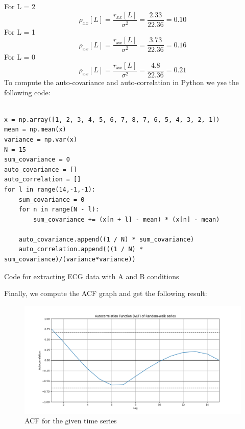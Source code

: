 \documentclass{article}
\begin{document}
   For L = 2
  \begin{equation}
       \rho_{xx}[L] = \frac{r_{xx}[L]}{\sigma ^2} = \frac{2.33}{22.36} = 0.10
 \end{equation}
   For L = 1
  \begin{equation}
       \rho_{xx}[L] = \frac{r_{xx}[L]}{\sigma ^2} = \frac{3.73}{22.36} = 0.16
 \end{equation}
   For L = 0
  \begin{equation}
      \rho_{xx}[L] = \frac{r_{xx}[L]}{\sigma ^2} = \frac{4.8}{22.36} = 0.21
 \end{equation}
To compute the auto-covariance and auto-correlation in Python we yse the following code:

\begin{listing}[H]
\begin{verbatim}

x = np.array([1, 2, 3, 4, 5, 6, 7, 8, 7, 6, 5, 4, 3, 2, 1])
mean = np.mean(x)
variance = np.var(x)
N = 15
sum_covariance = 0
auto_covariance = []
auto_correlation = []
for l in range(14,-1,-1):
    sum_covariance = 0
    for n in range(N - l):
        sum_covariance += (x[n + l] - mean) * (x[n] - mean)

    auto_covariance.append((1 / N) * sum_covariance)
    auto_correlation.append(((1 / N) * sum_covariance)/(variance*variance))
\end{verbatim}
\caption{Code for extracting ECG data with A and B conditions}
\label{listing:ecg1}
\end{listing}
 Finally, we compute the ACF graph and get the following result:
 \begin{figure}[H]
    \centering \includegraphics[width=0.7\linewidth]{img/last_task/acf_x.png}
    \caption{ACF for the given time series}
    \label{fig:acf_x}
    \end{figure}
\end{document}
